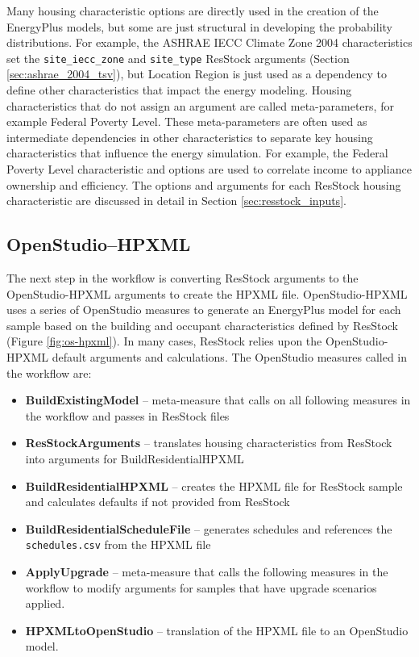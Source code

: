 Many housing characteristic options are directly used in the creation of the EnergyPlus models, but some are just structural in developing the probability distributions. For example, the ASHRAE IECC Climate Zone 2004 characteristics set the \texttt{site\_iecc\_zone} and \texttt{site\_type} ResStock arguments (Section \ref{sec:ashrae_2004_tsv}), but Location Region is just used as a dependency to define other characteristics that impact the energy modeling. Housing characteristics that do not assign an argument are called meta-parameters, for example Federal Poverty Level. These meta-parameters are often used as intermediate dependencies in other characteristics to separate key housing characteristics that influence the energy simulation. For example, the Federal Poverty Level characteristic and options are used to correlate income to appliance ownership and efficiency. The options and arguments for each ResStock housing characteristic are discussed in detail in Section \ref{sec:resstock_inputs}. 

\subsection{OpenStudio--HPXML}

The next step in the workflow is converting ResStock arguments to the OpenStudio-HPXML arguments to create the HPXML file. OpenStudio-HPXML uses a series of OpenStudio measures to generate an EnergyPlus model for each sample based on the building and occupant characteristics defined by ResStock (Figure \ref{fig:os-hpxml}). In many cases, ResStock relies upon the OpenStudio-HPXML default arguments and calculations. The OpenStudio measures called in the workflow are:

\begin{itemize}
    \item \textbf{BuildExistingModel} -- meta-measure that calls on all following measures in the workflow and passes in ResStock files
    \item \textbf{ResStockArguments} -- translates housing characteristics from ResStock into arguments for BuildResidentialHPXML
    \item \textbf{BuildResidentialHPXML} -- creates the HPXML file for ResStock sample and calculates defaults if not provided from ResStock
    \item \textbf{BuildResidentialScheduleFile} -- generates schedules and references the \texttt{schedules.csv} from the HPXML file
    \item \textbf{ApplyUpgrade} -- meta-measure that calls the following measures in the workflow to modify arguments for samples that have upgrade scenarios applied. 
    \item \textbf{HPXMLtoOpenStudio} -- translation of the HPXML file to an OpenStudio model.
\end{itemize}

